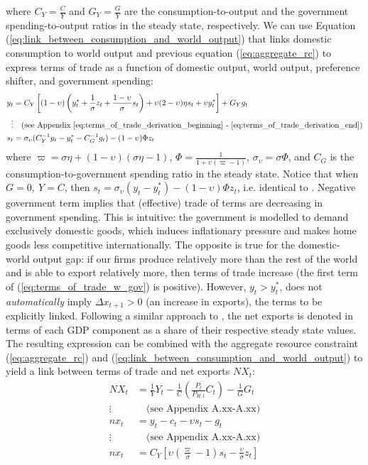 where $C_Y=\frac{C}{Y}$ and $G_Y = \frac{G}{Y}$ are the consumption-to-output and the government spending-to-output ratios in the steady state, respectively. We can use Equation (\ref{eq:link_between_consumption_and_world_output}) that links domestic consumption to world output and previous equation (\ref{eq:aggregate_rc}) to express terms of trade as a function of domestic output, world output, preference shifter, and government spending:
\begin{align}
    y_t &= C_Y\left[(1-\upsilon)\left( y^*_t + \frac{1}{\sigma}z_t + \frac{1-\upsilon}{\sigma}s_t \right) + \upsilon (2-\upsilon)\eta s_t + \upsilon y^*_t\right] + G_Y g_t \\
    \vdots & \quad \text{(see Appendix \ref{eq:terms_of_trade_derivation_beginning} - \ref{eq:terms_of_trade_derivation_end})} \nonumber \\
    s_t &= \sigma_\upsilon(C_Y^{-1} y_t - y^*_t - C_G^{-1} g_t) - (1-\upsilon)\Phi z_t \label{eq:terms_of_trade_w_gov}
\end{align}
where $\varpi = \sigma \eta + (1-\upsilon)(\sigma \eta - 1)$, $\Phi = \frac{1}{1 + \upsilon (\varpi - 1)}$, $\sigma_\upsilon = \sigma \Phi$, and $C_G$ is the consumption-to-government spending ratio in the steady state. Notice that when $G=0,\ Y=C$, then $s_t = \sigma_\upsilon(y_t - y^*_t) - (1-\upsilon)\Phi z_t$, i.e. identical to \textcite{jordigal_2015_monetary}. Negative government term implies that (effective) trade of terms are decreasing in government spending. This is intuitive: the government is modelled to demand exclusively domestic goods, which induces inflationary pressure and makes home goods less competitive internationally. The opposite is true for the domestic-world output gap: if our firms produce relatively more than the rest of the world and is able to export relatively more, then terms of trade increase (the first term of (\ref{eq:terms_of_trade_w_gov}) is positive). However, $y_t > y^*_t$, does not \textit{automatically} imply $\Delta x_{t+1} > 0$ (an increase in exports), the terms to be explicitly linked. Following a similar approach to \textcite{jordigal_2015_monetary}, the net exports is denoted in terms of each GDP component as a share of their respective steady state values. The resulting expression can be combined with the aggregate resource constraint (\ref{eq:aggregate_rc}) and (\ref{eq:link_between_consumption_and_world_output}) to yield a link between terms of trade and net exports $NX_t$:
\begin{align}
    NX_t &= \frac{1}{Y} Y_t - \frac{1}{C}\left(\frac{P_t}{P_{H,t}}C_t\right) - \frac{1}{G}G_t \\
    \vdots & \quad \text{(see Appendix A.xx-A.xx)} \nonumber \\
    nx_t &= y_t - c_t - \upsilon s_t - g_t \label{eq:trade_balance_w_consumption} \\
    \vdots & \quad \text{(see Appendix A.xx-A.xx)} \nonumber \\
    nx_t&=C_Y\left[\upsilon \left(\frac{\varpi}{\sigma} - 1\right) s_t - \frac{\upsilon}{\sigma}z_t \right] \label{eq:trade_balance_wout_consumption}
\end{align}
